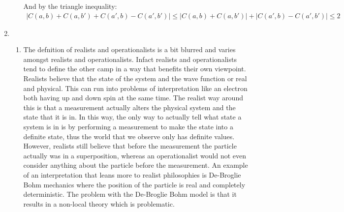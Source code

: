\documentclass[12pt,a4]{article}
\begin{document}
\begin{enumerate}
\begin{enumerate}
        And by the triangle inequality:
        \begin{align*}
          |C(a,b) + C(a,b') + C(a',b) - C(a',b')| \leq |C(a,b) + C(a,b')| + |C(a',b) - C(a',b')| \leq 2
        \end{align*}
    \end{enumerate}
  \item
    \begin{enumerate}
      \item
        The defnition of realists and operationalists is a bit blurred and varies amongst realists and operationalists.
        Infact realists and operationalists tend to define the other camp in a way that benefits their own viewpoint.
        Realists believe that the state of the system and the wave function or real and physical.
        This can run into problems of interpretation like an electron both having up and down spin at the same time.
        The realist way around this is that a measurement actually alters the physical system and the state that it is in.
        In this way, the only way to actually tell what state a system is in is by performing a measurement to make the state into a definite state, thus the world that we observe only has definite values.
        However, realists still believe that before the measurement the particle actually was in a superposition, whereas an operationalist would not even consider anything about the particle before the measurement.
        An example of an interpretation that leans more to realist philosophies is De-Broglie Bohm mechanics where the position of the particle is real and completely deterministic.
        The problem with the De-Broglie Bohm model is that it results in a non-local theory which is problematic.


\end{enumerate}
\end{enumerate}
\end{document}
